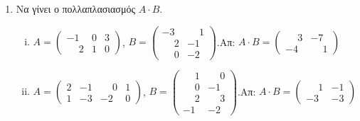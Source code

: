 



\geometry{margin=1in}



\thispagestyle{empty}

\begin{center}
\end{center}

\vspace{\baselineskip}


\begin{enumerate}

\item Να γίνει ο πολλαπλασιασμός $A \cdot B$.

\begin{enumerate}[i)]
    \renewcommand{\itemsep}{10pt}
\item $A=\begin{pmatrix}
-1 & 0 & 3 \\
\phantom{-}2 & 1 & 0 
\end{pmatrix}$,
\quad
$Β=\begin{pmatrix}
-3 & \phantom{-}1 \\
\phantom{-}2 & -1 \\ 
\phantom{-}0 & -2
\end{pmatrix}$.\hfill Απ: $A\cdot B = \begin{pmatrix}
\phantom{-}3 & -7 \\
-4 & \phantom{-}1
\end{pmatrix}$

\item $A=\begin{pmatrix}
2 & -1 & \phantom{-}0 & 1 \\
1 & -3 & -2 & 0
\end{pmatrix}$,
\quad
$Β=\begin{pmatrix}
\phantom{-}1 & \phantom{-}0 \\
\phantom{-}0 & -1 \\
\phantom{-}2 & \phantom{-}3 \\
-1 & -2 
\end{pmatrix}$.\hfill Απ: $A\cdot B=\begin{pmatrix}
\phantom{-}1 & -1 \\
-3 & -3 
\end{pmatrix}$


\end{enumerate}
\end{enumerate}
